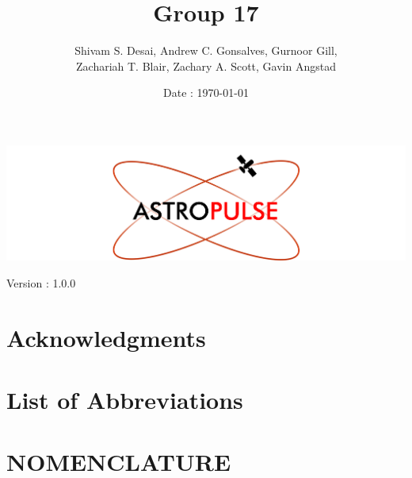 \documentclass[en, screen, 12pt]{report}
\title{Group 17 \\ \doctitle}
\author{
Shivam S. Desai, 
Andrew C. Gonsalves, 
Gurnoor Gill, \\
Zachariah T. Blair,
Zachary A. Scott,
Gavin Angstad
}
\date{Date : \mydate\today}
\makeatletter
\newcommand{\VersionNumber}{Version : 1.0.0} %
\renewcommand{\maketitle}{
  \begin{titlepage}
    \null\vfill
    \centering
    \includegraphics[width=1.0\textwidth]{images/ASTROPULSE LOGO.png}
    \par\vspace{2em}
    {\Huge\bfseries\@title\par}
    \vspace{1.5em}
    {\Large\@author}
    \par\vspace{2em}
    {\Large\@date}
    \par\vspace{2em}
    {\Large\VersionNumber}
    \vfill





    
    \null
  \end{titlepage}
}
\makeatother
\begin{document}
\maketitle

% 

\newpage
\tableofcontents
\newpage

\chapter*{Acknowledgments}


\newpage
\chapter*{List of Abbreviations}


\newpage
\chapter*{NOMENCLATURE}


















\end{document}
